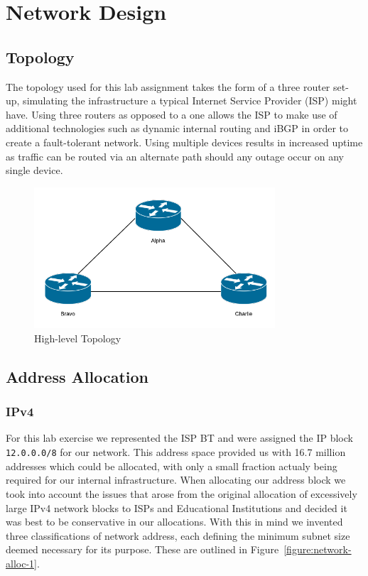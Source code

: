 \chapter{Network Design}

\section{Topology}

The topology used for this lab assignment takes the form of a three router set-
up, simulating the infrastructure a typical Internet Service Provider (ISP)
might have. Using three routers as opposed to a one allows the ISP to make use
of additional technologies such as dynamic internal routing and iBGP in order
to create a fault-tolerant network. Using multiple devices results in increased
uptime as traffic can be routed via an alternate path should any outage occur
on any single device.

\begin{figure}[!ht]
    \caption{High-level Topology}
    \centering
    \includegraphics[width=0.8\textwidth]{images/networkTopology.png}
\end{figure}

\section{Address Allocation}
\subsection{IPv4}
For this lab exercise we represented the ISP BT and were assigned the IP block
\texttt{12.0.0.0/8} for our network. This address space provided us with 16.7
million addresses which could be allocated, with only a small fraction actualy
being required for our internal infrastructure. When allocating our address
block we took into account the issues that arose from the original allocation
of excessively large IPv4 network blocks to ISPs and Educational Institutions
and decided it was best to be conservative in our allocations. With this in
mind we invented three classifications of network address, each defining the
minimum subnet size deemed necessary for its purpose. These are outlined in
Figure~\ref{figure:network-alloc-1}.

